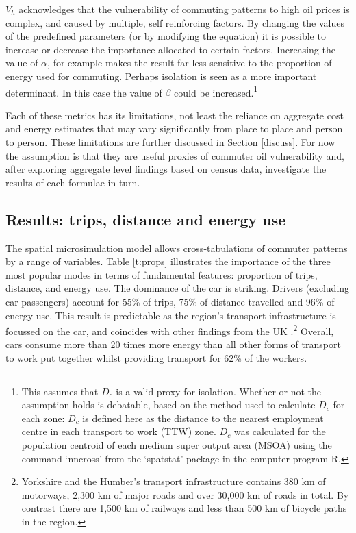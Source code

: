 \documentclass[a4paper, 11pt, twoside]{Thesis}
\begin{document}
$V_h$ acknowledges that the vulnerability of commuting patterns to high oil
prices is complex, and caused by multiple, self reinforcing factors. By
changing the values of the predefined parameters (or by modifying the equation)
it is possible to increase or decrease the importance allocated to certain
factors. Increasing the value of $\alpha$, for example makes the result far less
sensitive to the proportion of energy used for commuting. Perhaps isolation is
seen as a more important determinant. In this case the value of $\beta$ could
be increased.\footnote{This
assumes that $D_{c}$ is a valid proxy for isolation.
Whether or not the assumption holds is debatable, based on the method used to
calculate $D_{c}$ for each zone: $D_{c}$ is defined here as the
distance to the nearest employment centre in each
transport to work (TTW) zone.  $D_{c}$ was  calculated for the
population centroid of each medium super output area (MSOA) using
the command `nncross' from the `spatstat' package in the computer program R.
}



Each of these metrics has its limitations, not least the reliance on aggregate
cost and energy estimates that may vary significantly from place to place and
person to person. These limitations are further discussed in Section
\ref{discuss}.
For now the assumption is that they are useful proxies of commuter
oil vulnerability and, after exploring aggregate level
findings based on census data, investigate the results of each formulae in turn.


\subsection{Results: trips, distance and energy use}
\label{results8}

The spatial microsimulation model allows
cross-tabulations of commuter patterns by a range of variables.
Table \ref{t:props} illustrates the importance of
the three most popular modes in terms of fundamental features: proportion of
trips,
distance, and energy use.
The dominance of the car is striking. Drivers
(excluding car passengers) account for
55\% of trips, 75\% of distance travelled and
96\% of energy use. This result is predictable as the region's
transport infrastructure is focussed on the
car, and coincides with other findings from the UK
\citep{Brand2013}.\footnote{Yorkshire
and the Humber's transport infrastructure contains 380 km
of motorways, 2,300 km of major roads and over 30,000 km of roads in total.
By contrast there are 1,500 km of railways and less than 500 km of
bicycle paths in the region.}
Overall, cars consume more than 20 times more energy than all other
forms of transport to work put together whilst providing transport for
62\% of the workers.
\end{document}
